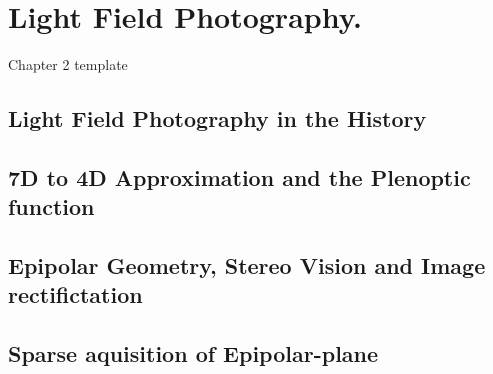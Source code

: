 
\chapter{Light Field Photography.}

Chapter 2 template

\section{Light Field Photography in the History}

\section{7D to 4D Approximation and the Plenoptic function}

\section{Epipolar Geometry, Stereo Vision and Image rectifictation}

\section{Sparse aquisition of Epipolar-plane}

